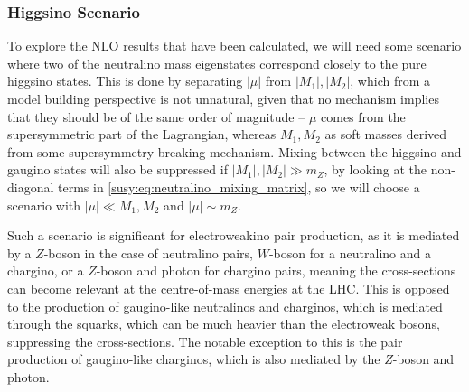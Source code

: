 \documentclass[../main.tex]{subfiles}
\begin{document}
\subsubsection*{Higgsino Scenario}
To explore the NLO results that have been calculated, we will need some scenario where two of the neutralino mass eigenstates correspond closely to the pure higgsino states.
This is done by separating \(|\mu|\) from \(|M_1|, |M_2|\), which from a model building perspective is not unnatural, given that no mechanism implies that they should be of the same order of magnitude -- \(\mu\) comes from the supersymmetric part of the Lagrangian, whereas \(M_1, M_2\) as soft masses derived from some supersymmetry breaking mechanism.
Mixing between the higgsino and gaugino states will also be suppressed if \(|M_1|, |M_2| \gg m_Z\), by looking at the non-diagonal terms in \cref{susy:eq:neutralino_mixing_matrix}, so we will choose a scenario with \(|\mu| \ll M_1, M_2\) and \(|\mu| \sim m_Z\).

Such a scenario is significant for electroweakino pair production, as it is mediated by a \(Z\)-boson in the case of neutralino pairs, \(W\)-boson for a neutralino and a chargino, or a \(Z\)-boson and photon for chargino pairs, meaning the cross-sections can become relevant at the centre-of-mass energies at the LHC\@.
This is opposed to the production of gaugino-like neutralinos and charginos, which is mediated through the squarks, which can be much heavier than the electroweak bosons, suppressing the cross-sections.
The notable exception to this is the pair production of gaugino-like charginos, which is also mediated by the \(Z\)-boson and photon.
\medskip
\end{document}
